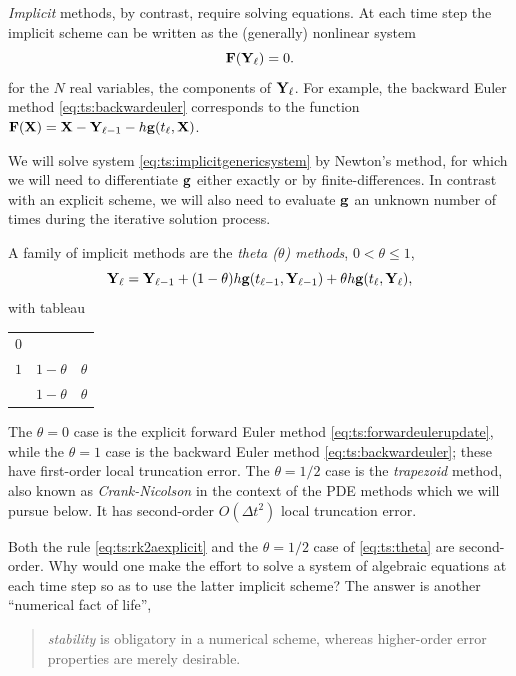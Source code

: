 \emph{Implicit} methods, by contrast, require solving equations.  At each time step the implicit scheme can be written as the (generally) nonlinear system
\begin{equation}
    \mathbf{F}(\mathbf{Y}_\ell)=0.  \label{eq:ts:implicitgenericsystem}
\end{equation}
for the $N$ real variables, the components of $\mathbf{Y}_\ell$.  For example, the backward Euler method \eqref{eq:ts:backwardeuler} corresponds to the function $\mathbf{F}(\mathbf{X}) = \mathbf{X} - \mathbf{Y}_{\ell-1} - h \mathbf{g}(t_\ell,\mathbf{X})$.

We will solve system \eqref{eq:ts:implicitgenericsystem} by Newton's method, for which we will need to differentiate $\mathbf{g}$ either exactly or by finite-differences.  In contrast with an explicit scheme, we will also need to evaluate $\mathbf{g}$ an unknown number of times during the iterative solution process.

A family of implicit methods are the \emph{theta ($\theta$) methods}, $0<\theta\le 1$,
\begin{equation}
\mathbf{Y}_\ell = \mathbf{Y}_{\ell-1} + (1-\theta) h \mathbf{g}(t_{\ell-1},\mathbf{Y}_{\ell-1}) + \theta h \mathbf{g}(t_\ell,\mathbf{Y}_{\ell}),  \label{eq:ts:theta}
\end{equation}
with tableau
\begin{center}
\begin{tabular}{c|cc}
$0$   \\
$1$ & $1-\theta$ & $\theta$ \\ \hline
    & $1-\theta$ & $\theta$
\end{tabular}
\end{center}
The $\theta=0$ case is the explicit forward Euler method \eqref{eq:ts:forwardeulerupdate}, while the $\theta=1$ case is the backward Euler method \eqref{eq:ts:backwardeuler}; these have first-order local truncation error.  The $\theta=1/2$ case is the \emph{trapezoid} method, also known as \emph{Crank-Nicolson} \citep{MortonMayers2005} in the context of the PDE methods which we will pursue below.  It has second-order $O(\Delta t^2)$ local truncation error.

Both the \RKtwoa rule \eqref{eq:ts:rk2aexplicit} and the $\theta=1/2$ case of \eqref{eq:ts:theta} are second-order.  Why would one make the effort to solve a system of algebraic equations at each time step so as to use the latter implicit scheme?  The answer is another ``numerical fact of life'',
\begin{quote}
\emph{stability} is obligatory in a numerical scheme, whereas higher-order error properties are merely desirable.
\end{quote}

